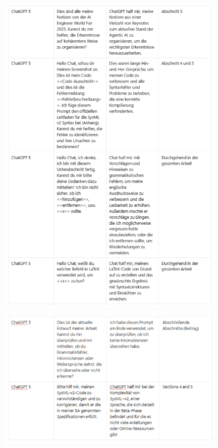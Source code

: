 \begin{figure}[htbp]
  \centering
  \includegraphics[width=\linewidth]{ressources/AI-usage/KI-NE3.png}
\end{figure}
\begin{figure}[htbp]
  \centering
  \includegraphics[width=\linewidth]{ressources/AI-usage/KI-NE4.png}
\end{figure}